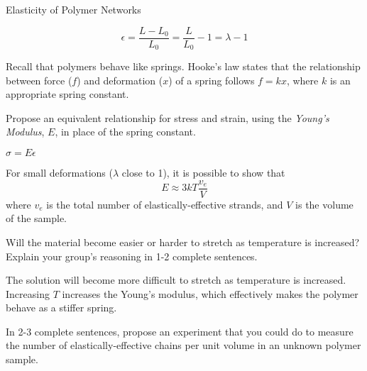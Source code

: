 \begin{activity}{Elasticity of Polymer Networks}
\begin{ctqs}
		\begin{solution}[0.8in]
			\begin{equation*}
				\epsilon = \frac{L-L_0}{L_0} = \frac{L}{L_0} -1 = \lambda - 1
			\end{equation*}
		\end{solution}
		
	\question Recall that polymers behave like springs.  Hooke's law states that the relationship between force ($f$) and deformation ($x$) of a spring follows $f=kx$, where $k$ is an appropriate spring constant.
	
		Propose an equivalent relationship for stress and strain, using the \emph{Young's Modulus}, $E$, in place of the spring constant.
		
		\label{\labelbase:ctq:sigmaEeps}
		
			\begin{solution}[0.5in]
			
				$\sigma = E\epsilon$
				
			\end{solution}
	
\end{ctqs}

\begin{infobox}
	For small deformations ($\lambda$ close to 1), it is possible to show that
	\begin{equation*}
		E \approx 3kT\frac{v_e}{V}
		\label{\labelbase:eqn:youngsmodulus}
	\end{equation*}
	where $v_e$ is the total number of elastically-effective strands, and $V$ is the volume of the sample.
\end{infobox}

\begin{ctqs}
	\question Will the material become easier or harder to stretch as temperature is increased?  Explain your group's reasoning in 1-2 complete sentences.
	
		\begin{solution}[1.5in]
			The solution will become more difficult to stretch as temperature is increased.  Increasing $T$ increases the Young's modulus, which effectively makes the polymer behave as a stiffer spring.
		\end{solution}
	
	\question In 2-3 complete sentences, propose an experiment that you could do to measure the number of elastically-effective chains per unit volume in an unknown polymer sample.
	
		\begin{solution}[1.75in]
		

\end{solution}
\end{ctqs}
\end{activity}
